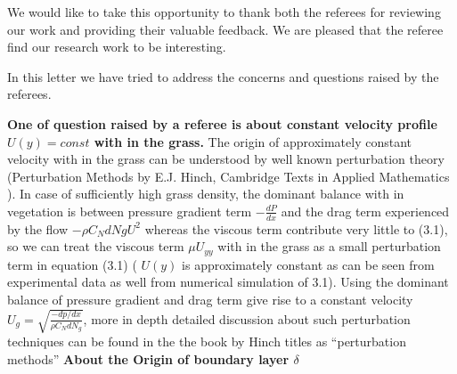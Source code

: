 \documentclass[a4paper,12pt]{article}
\begin{document}



 


We would like to take this opportunity to thank both the referees for reviewing our work and providing their valuable feedback. We are pleased that the referee find 
our research work to be interesting.


In this letter we have tried to address the concerns and questions raised by the referees.

\textbf{One of question raised by a referee is about constant velocity profile $U(y)=const$ with in the grass.} 
\newline
The origin of approximately constant velocity with in the grass 
can be understood by well known perturbation theory (Perturbation Methods by E.J. Hinch, Cambridge Texts in Applied Mathematics ). In case of sufficiently high grass density, the dominant balance
with in vegetation is between pressure gradient term $-\frac{dP}{dx}$ and the drag term experienced by the flow $-\rho C_N dNg U^2$ whereas the viscous term contribute very little 
to (3.1), so we can treat the viscous term $\mu U_{yy}$ with in the grass as a small perturbation term in equation (3.1) ( $U(y)$ is approximately constant as can be seen from experimental data as well from
numerical simulation of 3.1). Using the dominant balance of pressure gradient and drag term 
give rise to a constant velocity $U_g = \sqrt{\frac{-dp/dx}{\rho C_N d N_g}}$, more in depth detailed discussion about such perturbation techniques can be found in the the book by Hinch titles as ``perturbation
methods''
\newline
\textbf{ About the Origin of boundary layer $\delta$}
\end{document}
